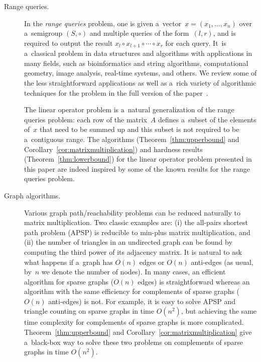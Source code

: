 \documentclass[review,onefignum,onetabnum]{siamart190516}
\begin{document}
\begin{description}
\item[Range queries.] In the \emph{range queries} problem,
one is given a~vector~$x=(x_1, \dotsc, x_n)$ over a~semigroup $(S, \circ)$ and
multiple queries of the form~$(l,r)$, and is required to
output the result $x_l \circ x_{l+1} \circ \dotsb \circ x_r$
for each query. It~is a~classical problem in data structures and
algorithms with applications in many fields, such as bioinformatics and
string algorithms, computational geometry, image analysis, real-time
systems, and others.
We review some of the less straightforward applications
as well as a~rich variety of algorithmic techniques for the problem in the full version of the paper~\cite{DBLP:journals/eccc/KulikovMMP19}.


The linear operator problem is a~natural generalization of the range queries
problem: each row of the matrix~$A$ defines a~subset of the elements of~$x$
that need to be summed up and this subset is not required to be
a~contiguous range. The algorithms (Theorem~\ref{thm:upperbound} and
Corollary~\ref{cor:matrixmultiplication}) and hardness results
(Theorem~\ref{thm:lowerbound}) for the linear operator problem presented in this
paper are indeed inspired by some of the known results for the range queries
problem.

\item[Graph algorithms.] Various graph path/reachability
problems can be reduced naturally to matrix multiplication.
Two classic examples are: (i) the all-pairs shortest path problem (APSP) is
reducible to min-plus matrix multiplication, and (ii) the number of triangles
in an undirected graph can be found by computing the third power of its
adjacency matrix.
It is natural to ask what happens if
a~graph has $O(n)$ edges or $O(n)$ anti-edges
(as usual, by~$n$ we denote the number of nodes).
In many cases, an efficient algorithm
for sparse graphs ($O(n)$ edges) is straightforward
whereas an algorithm with the same efficiency
for complements of sparse graphs ($O(n)$ anti-edges) is not. For
example, it is easy to solve APSP and triangle counting on sparse graphs in
time $O(n^2)$, but achieving the same time complexity for complements of sparse
graphs is more complicated.
Theorem~\ref{thm:upperbound} and Corollary~\ref{cor:matrixmultiplication} give a~black-box way to solve these two problems on complements of sparse graphs in time $O(n^2)$.


\end{description}
\end{document}
